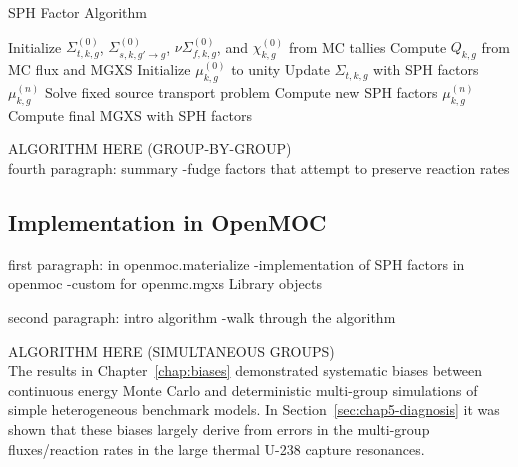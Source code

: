 \begin{algorithm}[h]
\caption{SPH Factor Algorithm}
\label{alg:chap6-sph}
\begin{algorithmic}[1]
  \State Initialize $\Sigma_{t,k,g}^{(0)}$, $\Sigma_{s,k,g'\rightarrow g}^{(0)}$, $\nu\Sigma_{f,k,g}^{(0)}$, and $\chi_{k,g}^{(0)}$ from MC tallies 
  \State Compute $Q_{k,g}$ from MC flux and \ac{MGXS} 
  \State Initialize $\mu_{k,g}^{(0)}$ to unity
    \State Update $\Sigma_{t,k,g}$ with \ac{SPH} factors $\mu_{k,g}^{(n)}$ 
    \State Solve fixed source transport problem\footnotemark {}
    \State Compute new \ac{SPH} factors $\mu_{k,g}^{(n)}$ 
  \EndWhile
  \State Compute final \ac{MGXS} with \ac{SPH} factors 
\end{algorithmic}
\end{algorithm}


ALGORITHM HERE (GROUP-BY-GROUP)\\

fourth paragraph: summary
-fudge factors that attempt to preserve reaction rates


\subsection{Implementation in OpenMOC}
\label{subsec:chap6-sph-openmoc}

first paragraph: in openmoc.materialize
-implementation of SPH factors in openmoc
-custom for openmc.mgxs Library objects

second paragraph: intro algorithm
-walk through the algorithm

ALGORITHM HERE (SIMULTANEOUS GROUPS)\\


The results in Chapter~\ref{chap:biases} demonstrated systematic biases between continuous energy Monte Carlo and deterministic multi-group simulations of simple heterogeneous benchmark models. In Section~\ref{sec:chap5-diagnosis} it was shown that these biases largely derive from errors in the multi-group fluxes/reaction rates in the large thermal U-238 capture resonances. 

